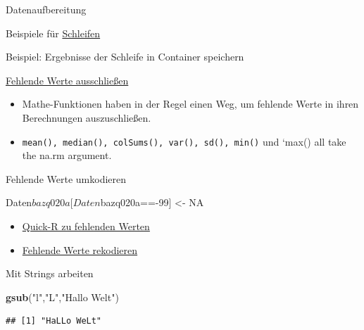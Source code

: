 \documentclass[ignorenonframetext,]{beamer}
\newenvironment{Shaded}{}{}
\newcommand{\KeywordTok}[1]{\textcolor[rgb]{0.00,0.44,0.13}{\textbf{{#1}}}}
\newcommand{\DecValTok}[1]{\textcolor[rgb]{0.25,0.63,0.44}{{#1}}}
\newcommand{\StringTok}[1]{\textcolor[rgb]{0.25,0.44,0.63}{{#1}}}
\newcommand{\OtherTok}[1]{\textcolor[rgb]{0.00,0.44,0.13}{{#1}}}
\newcommand{\NormalTok}[1]{{#1}}
\providecommand{\tightlist}{%
\setlength{\itemsep}{0pt}\setlength{\parskip}{0pt}}
\begin{document}
\begin{frame}[fragile]{Datenaufbereitung}
\begin{block}{Beispiele für
\href{https://www.r-bloggers.com/how-to-write-the-first-for-loop-in-r/}{Schleifen}}
\begin{block}{Beispiel: Ergebnisse der Schleife in Container speichern}
\end{block}

\end{block}

\begin{block}{\href{http://faculty.nps.edu/sebuttre/home/R/missings.html}{Fehlende
Werte ausschließen}}

\begin{itemize}
\tightlist
\item
  Mathe-Funktionen haben in der Regel einen Weg, um fehlende Werte in
  ihren Berechnungen auszuschließen.
\item
  \texttt{mean(),\ median(),\ colSums(),\ var(),\ sd(),\ min()} und
  `max() all take the na.rm argument.
\end{itemize}

\end{block}

\begin{block}{Fehlende Werte umkodieren}

\begin{Shaded}
\begin{Highlighting}[]
\NormalTok{Daten$bazq020a[Daten$bazq020a==-}\DecValTok{99}\NormalTok{] <-}\StringTok{ }\OtherTok{NA}
\end{Highlighting}
\end{Shaded}

\begin{itemize}
\item
  \href{http://www.statmethods.net/input/missingdata.html}{Quick-R zu
  fehlenden Werten}
\item
  \href{http://uc-r.github.io/na_recode}{Fehlende Werte rekodieren}
\end{itemize}

\end{block}

\begin{block}{Mit Strings arbeiten}

\begin{Shaded}
\begin{Highlighting}[]
\KeywordTok{gsub}\NormalTok{(}\StringTok{"l"}\NormalTok{,}\StringTok{"L"}\NormalTok{,}\StringTok{"Hallo Welt"}\NormalTok{)}
\end{Highlighting}
\end{Shaded}

\begin{verbatim}
## [1] "HaLLo WeLt"
\end{verbatim}


\end{block}
\end{frame}
\end{document}
